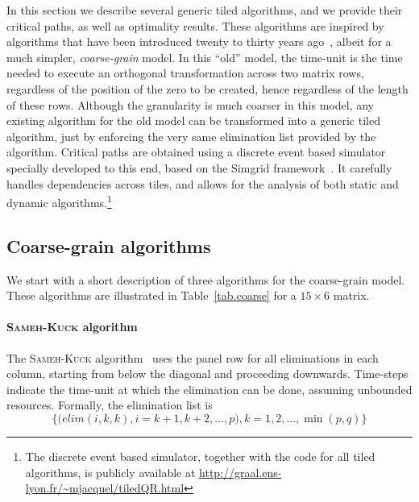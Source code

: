 \documentclass[a4paper,twopages]{article}
\newcommand{\elim}{\mathit{elim}}
\newcommand{\SK}{\textsc{Sameh-Kuck}\xspace}
\newcommand{\TiledQRURL}{\url{http://graal.ens-lyon.fr/~mjacquel/tiledQR.html}\xspace}
\begin{document}
In this section we describe several generic tiled algorithms, and we provide
their critical paths, as well as optimality results. These algorithms are
inspired by algorithms that have been introduced twenty to thirty years
ago~\cite{SamehKuck78,ModiClarke84,j14,j12}, albeit for a much simpler,
\emph{coarse-grain} model.  In this ``old'' model, the time-unit is the time needed to
execute an orthogonal transformation across two matrix rows, regardless of the
position of the zero to be created, hence regardless of the length of these rows.
Although the granularity is much coarser in this model, any existing algorithm
for the old model can be transformed into a generic tiled algorithm, just by
enforcing the very same elimination list provided by the algorithm.
Critical paths are obtained using a discrete event based simulator specially developed
to this end, based on the Simgrid framework~\cite{simgrid}. It carefully
handles dependencies across tiles, and allows for the analysis of both static and dynamic
algorithms.\footnote{The discrete event based simulator, together with the code for all tiled algorithms,
is publicly available at \TiledQRURL}

\subsection{Coarse-grain algorithms}\label{sec:Coarsegrain}

We start with a short description of three algorithms for the coarse-grain model.
These algorithms are illustrated in Table~\ref{tab.coarse} for a $15 \times 6$ matrix.

\paragraph{\SK algorithm}
The \SK algorithm~\cite{SamehKuck78} uses the panel row for all eliminations in
each column, starting from below the diagonal and proceeding downwards.
Time-steps indicate the time-unit at which the elimination can be done,
assuming unbounded resources. Formally, the elimination list is
\[ \Big\{ \Big( \elim(i, k, k), i=k+1, k+2, \dots, p \Big), k =1, 2, \dots, \min(p,q) \Big\} \]
\end{document}
